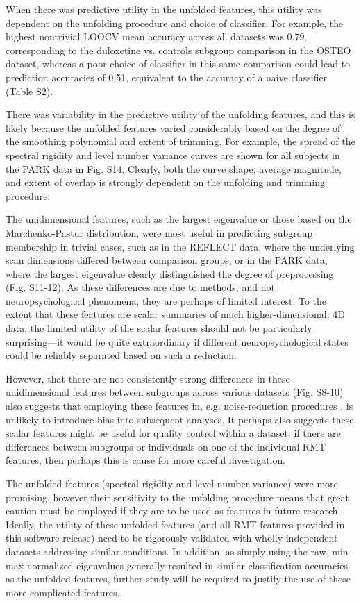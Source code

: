 \documentclass[NETN,manuscript]{stjour-new}
\begin{document}
When there was predictive utility in the unfolded features,	 this utility was dependent on the
unfolding procedure and choice of classifier. For example, the highest nontrivial LOOCV mean
accuracy across all datasets was 0.79, corresponding to the duloxetine vs. controls subgroup
comparison in the OSTEO dataset, whereas a poor choice of classifier in this same comparison could
lead to prediction accuracies of 0.51, equivalent to the accuracy of a naive classifier (Table S2).

There was variability in the predictive utility of the unfolding features, and this is likely
because the unfolded features varied considerably based on the degree of the smoothing polynomial
and extent of trimming. For example, the spread of the spectral rigidity and level number variance
curves are shown for all subjects in the PARK data in Fig. S14. Clearly, both the curve shape,
average magnitude, and extent of overlap is strongly dependent on the unfolding and trimming
procedure.

The unidimensional features, such as the largest eigenvalue or those based on the Marchenko-Pastur
distribution, were most useful in predicting subgroup membership in trivial cases, such as in the
REFLECT data, where the underlying scan dimensions differed between comparison groups, or in the
PARK data, where the largest eigenvalue clearly distinguished the degree of preprocessing (Fig.
S11-12). As these differences are due to methods, and not neuropsychological phenomena, they are
perhaps of limited interest. To the extent that these features are scalar summaries of much
higher-dimensional, 4D data, the limited utility of the scalar features should not be particularly
surprising—it would be quite extraordinary if different neuropsychological states could be reliably
separated based on such a reduction.

However, that there are not consistently strong differences in these unidimensional features between
subgroups across various datasets (Fig. S8-10) also suggests that employing these features in, e.g.
noise-reduction procedures
\citep[as in][]{veraartDiffusionMRINoise2016,veraartDenoisingDiffusionMRI2016}, is unlikely to introduce bias
into subsequent analyses. It perhaps also suggests these scalar features might be useful for quality
control within a dataset: if there are differences between subgroups or individuals on one of the
individual RMT features, then perhaps this is cause for more careful investigation.

The unfolded features (spectral rigidity and level number variance) were more promising, however
their sensitivity to the unfolding procedure means that great caution must be employed if they are
to be used as features in future research. Ideally, the utility of these unfolded features (and all
RMT features provided in this software release) need to be rigorously validated with wholly
independent datasets addressing similar conditions. In addition, as simply using the raw, min-max
normalized eigenvalues generally resulted in similar classification accuracies as the unfolded
features, further study will be required to justify the use of these more complicated features.
\end{document}
